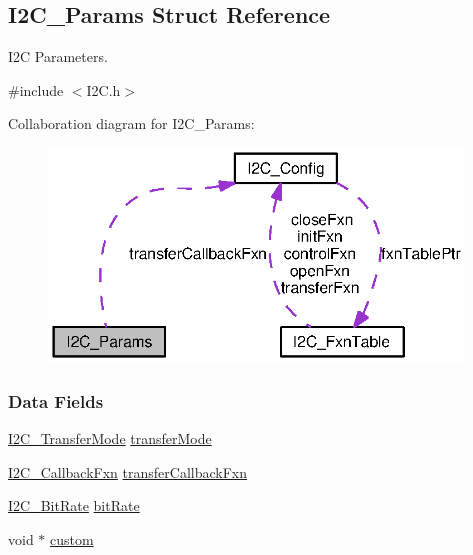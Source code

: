 \subsection{I2\+C\+\_\+\+Params Struct Reference}
\label{struct_i2_c___params}


I2\+C Parameters.  




{\ttfamily \#include $<$I2\+C.\+h$>$}



Collaboration diagram for I2\+C\+\_\+\+Params\+:
\nopagebreak
\begin{figure}[H]
\begin{center}
\leavevmode
\includegraphics[width=313pt]{struct_i2_c___params__coll__graph}
\end{center}
\end{figure}
\subsubsection*{Data Fields}
\begin{DoxyCompactItemize}
\item 
\hyperlink{_i2_c_8h_a39f3b9340fc4ee241b0d2da9b2841c26}{I2\+C\+\_\+\+Transfer\+Mode} \hyperlink{struct_i2_c___params_a79c5c51380ffbdb21df1dff6cb57de0e}{transfer\+Mode}
\item 
\hyperlink{_i2_c_8h_aa7389002843eba77425c73b441358fd1}{I2\+C\+\_\+\+Callback\+Fxn} \hyperlink{struct_i2_c___params_a57edf1b900368904779d0c57a73cf047}{transfer\+Callback\+Fxn}
\item 
\hyperlink{_i2_c_8h_ac954e3197f04c50293db466c4abb6fbe}{I2\+C\+\_\+\+Bit\+Rate} \hyperlink{struct_i2_c___params_ad31857f6dbedb77c60c92cc8cd8cde0c}{bit\+Rate}
\item 
void $\ast$ \hyperlink{struct_i2_c___params_a2416cc06d853e6cc24e1f294dfebb194}{custom}
\end{DoxyCompactItemize}


